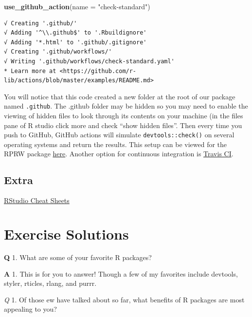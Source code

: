 \documentclass[
]{book}
\newenvironment{Shaded}{\begin{snugshade}}{\end{snugshade}}
\newcommand{\DataTypeTok}[1]{\textcolor[rgb]{0.13,0.29,0.53}{#1}}
\newcommand{\KeywordTok}[1]{\textcolor[rgb]{0.13,0.29,0.53}{\textbf{#1}}}
\newcommand{\NormalTok}[1]{#1}
\newcommand{\StringTok}[1]{\textcolor[rgb]{0.31,0.60,0.02}{#1}}
\begin{document}
\begin{Shaded}
\begin{Highlighting}[]
\KeywordTok{use_github_action}\NormalTok{(}\DataTypeTok{name =} \StringTok{"check-standard"}\NormalTok{)}
\end{Highlighting}
\end{Shaded}

\begin{verbatim}
√ Creating '.github/'
√ Adding '^\\.github$' to '.Rbuildignore'
√ Adding '*.html' to '.github/.gitignore'
√ Creating '.github/workflows/'
√ Writing '.github/workflows/check-standard.yaml'
* Learn more at <https://github.com/r-lib/actions/blob/master/examples/README.md>
\end{verbatim}

You will notice that this code created a new folder at the root of our package named \texttt{.github}. The .github folder may be hidden so you may need to enable the viewing of hidden files to look through its contents on your machine (in the files pane of R studio click more and check ``show hidden files''. Then every time you push to GitHub, GitHub actions will simulate \texttt{devtools::check()} on several operating systems and return the results. This setup can be viewed for the RPRW package \href{https://github.com/michaeldumelle/RPRW/actions}{here}. Another option for continuous integration is \href{https://travis-ci.org/}{Travis CI}.

\hypertarget{extra}{%
\section{Extra}\label{extra}}

\href{https://www.rstudio.com/resources/cheatsheets/}{RStudio Cheat Sheets}

\hypertarget{exercise-solutions}{%
\chapter{Exercise Solutions}\label{exercise-solutions}}

\textbf{Q} 1. What are some of your favorite R packages?

\textbf{A} 1. This is for you to answer! Though a few of my favorites include devtools, styler, rticles, rlang, and purrr.

\emph{Q} 1. Of those ew have talked about so far, what benefits of R packages are most appealing to you?
\end{document}
